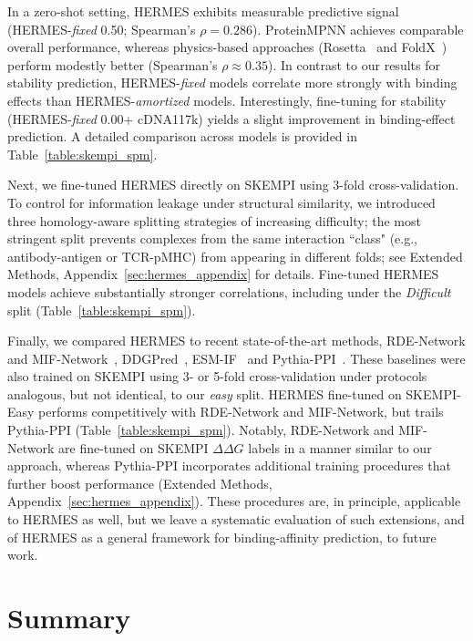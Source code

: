In a zero-shot setting, HERMES exhibits measurable predictive signal (HERMES-\emph{fixed} 0.50;
Spearman's $\rho = 0.286$). ProteinMPNN achieves comparable overall performance, whereas
physics-based approaches (Rosetta~\citep{chaudhury_pyrosetta_2010} and
FoldX~\citep{schymkowitz_foldx_2005}) perform modestly better (Spearman's $\rho \approx 0.35$). In
contrast to our results for stability prediction, HERMES-\emph{fixed} models correlate more strongly
with binding effects than HERMES-\emph{amortized} models. Interestingly, fine-tuning for stability
(HERMES-\emph{fixed} 0.00+ cDNA117k) yields a slight improvement in binding-effect prediction. A
detailed comparison across models is provided in Table~\ref{table:skempi_spm}.

Next, we fine-tuned HERMES directly on SKEMPI using 3-fold cross-validation. To control for
information leakage under structural similarity, we introduced three homology-aware splitting
strategies of increasing difficulty; the most stringent split prevents complexes from the same
interaction ``class" (e.g., antibody-antigen or TCR-pMHC) from appearing in different folds; see
Extended Methods, Appendix~\ref{sec:hermes_appendix} for details.
Fine-tuned HERMES models achieve substantially stronger correlations, including
under the {\em Difficult} split (Table~\ref{table:skempi_spm}).

Finally, we compared HERMES to recent state-of-the-art methods, RDE-Network and
MIF-Network~\citep{luo_rotamer_2022}, DDGPred~\citep{shan_deep_2022},
ESM-IF~\citep{hsu_learning_2022} and Pythia-PPI~\citep{tao_reliable_2025}. These baselines were also
trained on SKEMPI using 3- or 5-fold cross-validation under protocols analogous, but not identical,
to our {\em easy} split. HERMES fine-tuned on SKEMPI-Easy performs competitively with RDE-Network
and MIF-Network, but trails Pythia-PPI (Table~\ref{table:skempi_spm}). Notably, RDE-Network and
MIF-Network are fine-tuned on SKEMPI $\Delta\Delta G$ labels in a manner similar to our approach,
whereas Pythia-PPI incorporates additional training procedures that further boost performance
(Extended Methods, Appendix~\ref{sec:hermes_appendix}). These procedures are, in principle, applicable
to HERMES as well, but we leave a
systematic evaluation of such extensions, and of HERMES as a general framework for binding-affinity
prediction, to future work.


\section{Summary}

